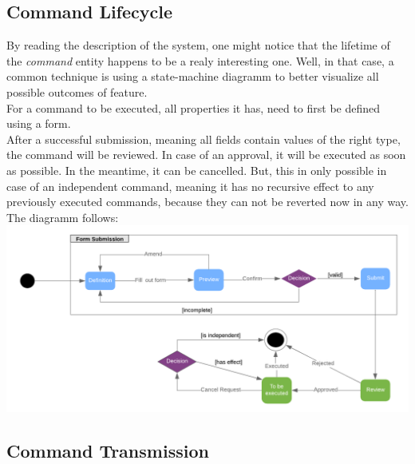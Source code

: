 \documentclass{article}
\begin{document}
\subsection{Command Lifecycle}
By reading the description of the system, one might notice that the lifetime of the \emph{command} entity happens to be a realy interesting one. Well, in that case, a common technique is using a state-machine diagramm to better visualize all possible outcomes of feature.\\
For a command to be executed, all properties it has, need to first be defined using a form.\\
After a successful submission, meaning all fields contain values of the right type, the command will be reviewed. In case of an approval, it will be executed as soon as possible. In the meantime, it can be cancelled. But, this in only possible in case of an independent command, meaning it has no recursive effect to any previously executed commands, because they can not be reverted now in any way. The diagramm follows:\\
\includegraphics[scale=0.325]{state}  

\subsection{Command Transmission}
\end{document}
